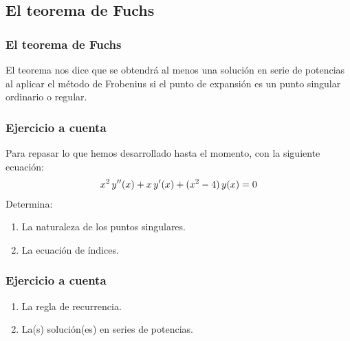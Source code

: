 \documentclass[12pt]{beamer}
\begin{document}
\subsection{El teorema de Fuchs}

\begin{frame}
\frametitle{El teorema de Fuchs}
El teorema nos dice que se obtendrá al menos una solución en serie de potencias al aplicar el método de Frobenius si el punto de expansión es un punto singular ordinario o regular.
\end{frame}
\begin{frame}
\frametitle{Ejercicio a cuenta}
Para repasar lo que hemos desarrollado hasta el momento, con la siguiente ecuación:
\pause
\begin{align*}
x^{2} \, {y}^{\prime \prime} (x) + x \, {y}^{\prime} (x) + (x^{2} - 4) \, y (x) = 0
\end{align*}
Determina:
\begin{enumerate}
\item La naturaleza de los puntos singulares.
\item La ecuación de índices.
\seti
\end{enumerate}
\end{frame}
\begin{frame}
\frametitle{Ejercicio a cuenta}
\begin{enumerate}
\conti
\item La regla de recurrencia.
\item La(s) solución(es) en series de potencias.
\end{enumerate}
\end{frame}
\end{document}
